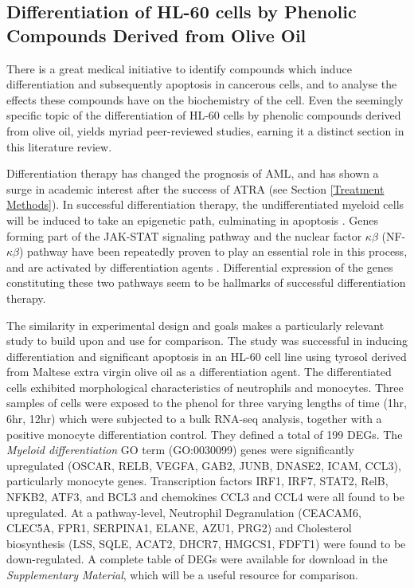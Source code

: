 \subsection{Differentiation of HL-60 cells by Phenolic Compounds Derived from Olive Oil}
\label{Differentiation_AML}
There is a great medical initiative to identify compounds which induce differentiation and subsequently apoptosis in cancerous cells, and to analyse the effects these compounds have on the biochemistry of the cell. Even the seemingly specific topic of the differentiation of HL-60 cells by phenolic compounds derived from olive oil, yields myriad peer-reviewed studies, earning it a distinct section in this literature review. 

Differentiation therapy has changed the prognosis of \ac{AML}, and has shown a surge in academic interest after the success of \ac{ATRA} (see Section \ref{Treatment Methods}). In successful differentiation therapy, the undifferentiated myeloid cells will be induced to take an epigenetic path, culminating in apoptosis \citep{santos2000expression, mark2017transcriptomes}. Genes forming part of the JAK-STAT signaling pathway and the nuclear factor $\kappa\beta$ (NF-$\kappa\beta$) pathway have been repeatedly proven to play an essential role in this process, and are activated by differentiation agents \citep{matikainen1997retinoic, gianni1997stat1, cohen2005jak, ren2013resveratrol, iwata2016parp9}. Differential expression of the genes constituting  these two pathways seem to be hallmarks of successful differentiation therapy.

The similarity in experimental design and goals makes \cite{gatt2021tyrosol} a particularly relevant study to build upon and use for comparison. The study was successful in inducing differentiation and significant apoptosis in an HL-60 cell line using tyrosol derived from Maltese extra virgin olive oil as a differentiation agent. The differentiated cells exhibited morphological characteristics of neutrophils and monocytes. Three samples of cells were exposed to the phenol for three varying lengths of time (1hr, 6hr, 12hr) which were subjected to a bulk RNA-seq analysis, together with a positive monocyte differentiation control. They defined a total of 199 \ac{DEG}s. The \textit{Myeloid differentiation} \ac{GO} term (\ac{GO}:0030099) genes were significantly upregulated (OSCAR, RELB, VEGFA, GAB2, JUNB, DNASE2, ICAM, CCL3), particularly monocyte genes. Transcription factors IRF1, IRF7, STAT2, RelB, NFKB2, ATF3, and BCL3 and chemokines CCL3 and CCL4 were all found to be upregulated. At a pathway-level, Neutrophil Degranulation (CEACAM6, CLEC5A, FPR1, SERPINA1, ELANE, AZU1, PRG2) and Cholesterol biosynthesis (LSS, SQLE, ACAT2, DHCR7, HMGCS1, FDFT1) were found to be down-regulated. A complete table of \ac{DEG}s were available for download in the \textit{Supplementary Material}, which will be a useful resource for comparison.

